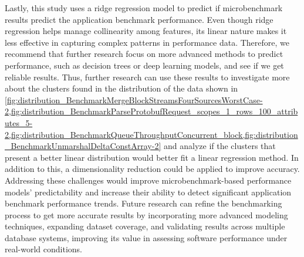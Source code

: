 Lastly, this study uses a ridge regression model to predict if microbenchmark results predict the application benchmark performance. Even though ridge regression helps manage collinearity among features, its linear nature makes it less effective in capturing complex patterns in performance data. Therefore, we recommend that further research focus on more advanced methods to predict performance, such as decision trees or deep learning models, and see if we get reliable results. Thus, further research can use these results to investigate more about the clusters found in the distribution of the data shown in \cref{fig:distribution_BenchmarkMergeBlockStreamsFourSourcesWorstCase-2,fig:distribution_BenchmarkParseProtobufRequest_scopes_1_rows_100_attributes_5-2,fig:distribution_BenchmarkQueueThroughputConcurrent_block,fig:distribution_BenchmarkUnmarshalDeltaConstArray-2} and analyze if the clusters that present a better linear distribution would better fit a linear regression method. In addition to this, a dimensionality reduction could be applied to improve accuracy. Addressing these challenges would improve microbenchmark-based performance models' predictability and increase their ability to detect significant application benchmark performance trends. Future research can refine the benchmarking process to get more accurate results by incorporating more advanced modeling techniques, expanding dataset coverage, and validating results across multiple database systems, improving its value in assessing software performance under real-world conditions.  